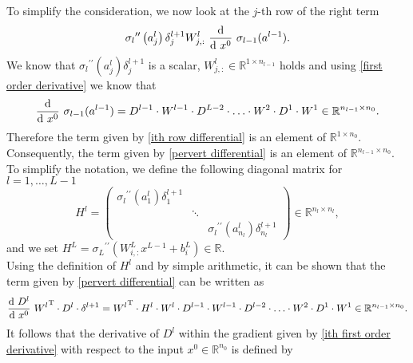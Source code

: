 To simplify the consideration, we now look at the $j$-th row of the right term
\begin{equation}
    \label{ith row differential}
    {\sigma_{l}}^{\prime \prime} \left( a^{l}_{j} \right) \delta^{l+1}_{j}  W^{l}_{j,:} \ \frac{\textup{d}}{\textup{d} \ x^0} \  \sigma_{l-1}(a^{l-1}).
\end{equation}
We know that ${\sigma_{l}}^{\prime \prime} \left( a^{l}_{j} \right) \delta^{l+1}_{j}$ is a scalar, $W^{l}_{j,:} \in \mathbb{R}^{1 \times n_{l-1}}$ holds and using \cref{first order derivative} we know that
\begin{equation}
    \label{ith row differential 2}
    \frac{\textup{d}}{\textup{d} \ x^0} \  \sigma_{l-1}(a^{l-1}) = D^{l-1} \cdot W^{l-1} \cdot D^{L-2} \cdot \ldots \cdot W^2 \cdot D^1 \cdot W^{1} \in \mathbb{R}^{n_{l-1} \times n_0}.
\end{equation}
Therefore the term given by \cref{ith row differential} is an element of $\mathbb{R}^{1 \times n_0}$. Consequently, the term given by \cref{pervert differential} is an element of $\mathbb{R}^{n_{l-1} \times n_0}$. \\
To simplify the notation, we define the following diagonal matrix for $l = 1, \ldots, L-1$
\begin{equation}
    \label{second:derivative:activation:function}
    H^{l} = \begin{pmatrix} {\sigma_{l}}^{\prime \prime} \left( a^{l}_1 \right) \delta^{l+1}_1 & & \\ & \ddots & \\ & & {\sigma_{l}}^{\prime \prime} \left( a^{l}_{n_l} \right) \delta^{l+1}_{n_l} \end{pmatrix} \in \mathbb{R}^{n_l \times n_l}, 
\end{equation}
and we set $H^{L} = {\sigma_L}^{\prime \prime} \left(W^L_{i,:} x^{L-1}  + b^{L}_{i} \right) \in \mathbb{R}$. \\
Using the definition of $H^{l}$ and by simple arithmetic, it can be shown that the term given by \cref{pervert differential} can be written as
\begin{equation*}
    \frac{\textup{d} \ D^{l}}{\textup{d} \ x^0} \  {W^{l}}^{\mathrm{T}} \cdot D^{l} \cdot \delta^{l+1} = {W^{l}}^{\mathrm{T}} \cdot H^{l} \cdot W^l \cdot D^{l-1} \cdot W^{l-1} \cdot D^{l-2} \cdot \ldots \cdot W^2 \cdot D^1 \cdot W^{1} \in \mathbb{R}^{n_{l-1} \times n_0}.
\end{equation*}
It follows that the derivative of $D^l$ within the gradient given by \cref{ith first order derivative} with respect to the input $x^0 \in \mathbb{R}^{n_0}$ is defined by  
